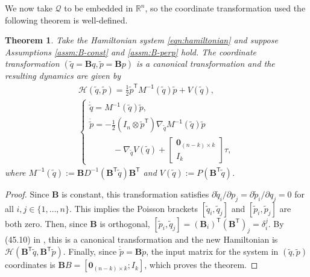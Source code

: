 \documentclass[journal,twoside,web]{ieeecolor}
\newtheorem{thm}{Theorem}%
\newcommand*{\tpose}{^\mathsf{T}}
\newcommand*{\R}{\mathbb{R}}
\newcommand*{\Minv}{M^\mathsf{-1}}
\newcommand*{\Id}[1]{I_{#1}}
\newcommand*{\Zmat}[1]{\bm{0}_{#1}}
\newcommand*{\simpleB}{\begin{bmatrix}\Zmat{(n-k)\times k}\\ \Id{k}\end{bmatrix}}
\begin{document}
We now take \(\mathcal{Q}\) to be embedded in \(\R^n\), so the coordinate
transformation used the following theorem is well-defined.

\begin{thm}\label{thm:simply-actuated}
    Take the Hamiltonian system \eqref{eqn:hamiltonian} and suppose
    Assumptions \ref{assm:B-const} and \ref{assm:B-perp} hold.
    The coordinate transformation
    \(\left(\tilde{q} = \mathbf{B}q, \tilde{p} = \mathbf{B}p\right)\)
    is a canonical transformation and the resulting dynamics are given by 
    \begin{gather}\label{eqn:simple-hamiltonian}
        \mathcal{H}(\tilde{q},\tilde{p}) = 
        \frac{1}{2} \tilde{p}\tpose \Minv(\tilde{q}) \tilde{p} + V(\tilde{q})
        , \\
       \begin{cases}
           \dot{\tilde{q}} = \Minv(\tilde{q})\tilde{p}
           , \\
           \dot{\tilde{p}} = -\frac{1}{2} (\Id{n} \otimes \tilde{p}\tpose)
           \nabla_{\tilde{q}} \Minv(\tilde{q}) \tilde{p} \\
           \phantom{---} - \nabla_{\tilde{q}} V(\tilde{q}) + \simpleB \tau
            ,
        \end{cases} \nonumber
    \end{gather}
    where 
    \(\Minv(\tilde{q}) := 
    \mathbf{B}D^{-1}(\mathbf{B}\tpose \tilde{q})\mathbf{B}\tpose\)
    and
    \(V(\tilde{q}) := P(\mathbf{B}\tpose \tilde{q})\).
\end{thm}
\begin{proof}
    Since \(\mathbf{B}\) is constant, this transformation satisfies
    \(\partial\tilde{q}_i/\partial p_j = \partial\tilde{p}_i/\partial q_j = 0\) for all 
    \(i,j \in \{1,\ldots,n\}\).
    This implies the Poisson brackets \([\tilde{q}_i, \tilde{q}_j]\)
    and \([\tilde{p}_i,\tilde{p}_j]\) are both zero.
    Then, since \(\mathbf{B}\) is orthogonal, 
    \([\tilde{p}_i, \tilde{q}_j] = (\mathbf{B}_i)\tpose (\mathbf{B}\tpose)_j
        = \delta_i^j\).
    By (45.10) in \cite{landau_mechanics}, this is a canonical transformation
    and the new Hamiltonian is
    \(\mathcal{H}(\mathbf{B}\tpose \tilde{q}, \mathbf{B}\tpose \tilde{p})\).
    Finally, since \(\dot{\tilde{p}} = \mathbf{B} \dot{p}\), the input
    matrix for the system in \((\tilde{q},\tilde{p})\) coordinates is
    \(\mathbf{B}B = [\Zmat{(n-k)\times k}; \Id{k}]\), which proves the theorem.
\end{proof}
\end{document}

